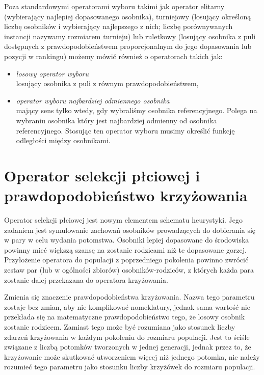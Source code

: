 \documentclass[twoside]{iisthesis}
\begin{document}
Poza standardowymi operatorami wyboru takimi jak operator elitarny (wybierający najlepiej dopasowanego osobnika), turniejowy (losujący określoną liczbę osobników i wybierający najlepszego z nich; liczbę porównywanych instancji nazywamy rozmiarem turnieju) lub ruletkowy (losujący osobnika z puli dostępnych z prawdopodobieństwem proporcjonalnym do jego dopasowania lub pozycji w rankingu) możemy mówić również o operatorach takich jak:
\begin{itemize}
	\item \emph{losowy operator wyboru} \\ losujący osobnika z puli z równym prawdopodobieństwem,
	\item \emph{operator wyboru najbardziej odmiennego osobnika} \\ mający sens tylko wtedy, gdy wybraliśmy osobnika referencyjnego. Polega na wybraniu osobnika który jest najbardziej odmienny od osobnika referencyjnego. Stosując ten operator wyboru musimy określić funkcję odległości między osobnikami.
\end{itemize}

\section{Operator selekcji płciowej i prawdopodobieństwo krzyżowania} \label{section_genderSel}

Operator selekcji płciowej jest nowym elementem schematu heurystyki. Jego zadaniem jest symulowanie zachowań osobników prowadzących do dobierania się w pary w celu wydania potomstwa. Osobniki lepiej dopasowane do środowiska powinny mieć większą szansę na zostanie rodzicami niż te dopasowane gorzej. Przyłożenie operatora do populacji z poprzedniego pokolenia powinno zwrócić zestaw par (lub w ogólności zbiorów) osobników-rodziców, z których każda para zostanie dalej przekazana do operatora krzyżowania.

Zmienia się znaczenie prawdopodobieństwa krzyżowania. Nazwa tego parametru zostaje bez zmian, aby nie komplikować nomeklatury, jednak sama wartość nie przekłada się na matematyczne prawdopodobieństwo tego, że losowy osobnik zostanie rodzicem. Zamiast tego może być rozumiana jako stosunek liczby zdarzeń krzyżowania w każdym pokoleniu do rozmiaru populacji. Jest to ściśle związane z liczbą potomków tworzonych w jednej generacji, jednak przez to, że krzyżowanie może skutkować utworzeniem więcej niż jednego potomka, nie należy rozumieć tego parametru jako stosunku liczby krzyżówek do rozmiaru populacji.
\end{document}
